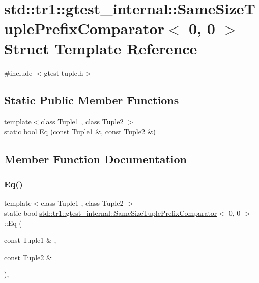 \hypertarget{structstd_1_1tr1_1_1gtest__internal_1_1_same_size_tuple_prefix_comparator_3_010_00_010_01_4}{}\section{std\+::tr1\+::gtest\+\_\+internal\+::Same\+Size\+Tuple\+Prefix\+Comparator$<$ 0, 0 $>$ Struct Template Reference}
\label{structstd_1_1tr1_1_1gtest__internal_1_1_same_size_tuple_prefix_comparator_3_010_00_010_01_4}


{\ttfamily \#include $<$gtest-\/tuple.\+h$>$}

\subsection*{Static Public Member Functions}
\begin{DoxyCompactItemize}
\item 
{\footnotesize template$<$class Tuple1 , class Tuple2 $>$ }\\static bool \mbox{\hyperlink{structstd_1_1tr1_1_1gtest__internal_1_1_same_size_tuple_prefix_comparator_3_010_00_010_01_4_a4f209822266c6bb1832c49750a11ef95}{Eq}} (const Tuple1 \&, const Tuple2 \&)
\end{DoxyCompactItemize}


\subsection{Member Function Documentation}
\mbox{\label{structstd_1_1tr1_1_1gtest__internal_1_1_same_size_tuple_prefix_comparator_3_010_00_010_01_4_a4f209822266c6bb1832c49750a11ef95}} 
\subsubsection{\texorpdfstring{Eq()}{Eq()}}
{\footnotesize\ttfamily template$<$class Tuple1 , class Tuple2 $>$ \\
static bool \mbox{\hyperlink{structstd_1_1tr1_1_1gtest__internal_1_1_same_size_tuple_prefix_comparator}{std\+::tr1\+::gtest\+\_\+internal\+::\+Same\+Size\+Tuple\+Prefix\+Comparator}}$<$ 0, 0 $>$\+::Eq (\begin{DoxyParamCaption}\item[{const Tuple1 \&}]{,  }\item[{const Tuple2 \&}]{ }\end{DoxyParamCaption})\hspace{0.3cm}{\ttfamily [inline]}, {\ttfamily [static]}}



